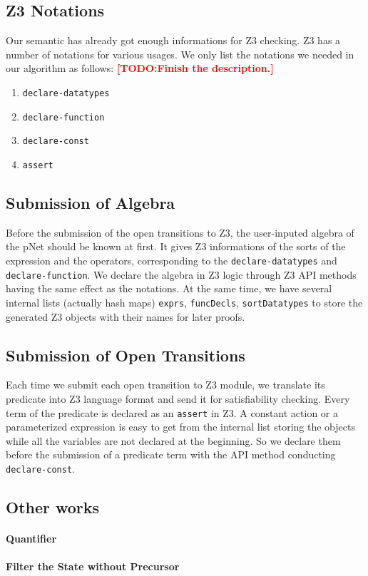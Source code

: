 \documentclass[a4paper]{llncs}
\newcommand{\TODO}[1]{\textcolor{red}{\textbf{[TODO:#1]}}}
\begin{document}
\subsection{Z3 Notations}
Our semantic has already got enough informations for Z3 checking. Z3 has a number of notations for various usages. We only list the notations we needed in our algorithm as follows:
\TODO{Finish the description.}
\begin{enumerate}
\item \texttt{declare-datatypes}
\item \texttt{declare-function}
\item \texttt{declare-const}
\item \texttt{assert}
\end{enumerate}

\subsection{Submission of Algebra}
Before the submission of the open transitions to Z3, the user-inputed algebra of the pNet should be known at first. It gives Z3 informations of the sorts of the expression and the operators, corresponding to the  
\texttt{declare-datatypes} and \texttt{declare-function}. We declare the algebra in Z3 logic through Z3 API methods having the same effect as the notations. At the same time, we have several internal lists (actually hash maps) \texttt{exprs}, \texttt{funcDecls}, \texttt{sortDatatypes} to store the generated Z3 objects with their names for later proofs.

\subsection{Submission of Open Transitions}
Each time we submit each open transition to Z3 module, we translate its predicate into Z3 language format and send it for satisfiability checking. Every term of the predicate is declared as an \texttt{assert} in Z3. A constant action or a parameterized expression is easy to get from the internal list storing the objects while all the variables are not declared at the beginning. So we declare them before the submission of a predicate term with the API method conducting \texttt{declare-const}.

\subsection{Other works}
\paragraph{Quantifier}
\paragraph{Filter the State without Precursor}
\end{document}
